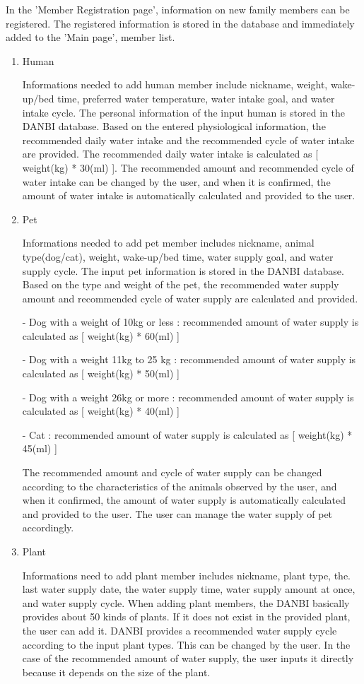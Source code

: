 \documentclass[conference]{IEEEtran}
\begin{document}
\begin{itemize}
 In the 'Member Registration page', information on new family members can be registered. The registered information is stored in the database and immediately added to the 'Main page', member list.
\begin{enumerate}
\setlength{\parindent}{2ex}
\item Human

Informations needed to add human member include nickname, weight, wake-up/bed time, preferred water temperature, water intake goal, and water intake cycle. The personal information of the input human is stored in the DANBI database. Based on the entered physiological information, the recommended daily water intake and the recommended cycle of water intake are provided. The recommended daily water intake is calculated as [ weight(kg) * 30(ml) ].\cite{waterIntake_Human} The recommended amount and recommended cycle of water intake can be changed by the user, and when it is confirmed, the amount of water intake is automatically calculated and provided to the user.
\item Pet

Informations needed to add pet member includes nickname, animal type(dog/cat), weight, wake-up/bed time, water supply goal, and water supply cycle. The input pet information is stored in the DANBI database. Based on the type and weight of the pet, the recommended water supply amount and recommended cycle of water supply are calculated and provided. \cite{waterIntake_Pet}

- Dog with a weight of 10kg or less : recommended amount of water supply is calculated as [ weight(kg) * 60(ml) ]

- Dog with a weight 11kg to 25 kg : recommended amount of water supply is calculated as [ weight(kg) * 50(ml) ]

- Dog with a weight 26kg or more : recommended amount of water supply is calculated as [ weight(kg) * 40(ml) ]

- Cat : recommended amount of water supply is calculated as [ weight(kg) * 45(ml) ]

The recommended amount and cycle of water supply can be changed according to the characteristics of the animals observed by the user, and when it confirmed, the amount of water supply is automatically calculated and provided to the user. The user can manage the water supply of pet accordingly.
\item Plant

Informations need to add plant member includes nickname, plant type, the. last water supply date, the water supply time, water supply amount at once, and water supply cycle. When adding plant members, the DANBI basically provides about 50 kinds of plants. If it does not exist in the provided plant, the user can add it. DANBI provides a recommended water supply cycle according to the input plant types. \cite{waterIntake_Plant} This can be changed by the user. In the case of the recommended amount of water supply, the user inputs it directly because it depends on the size of the plant.


\end{enumerate}
\end{itemize}
\end{document}
